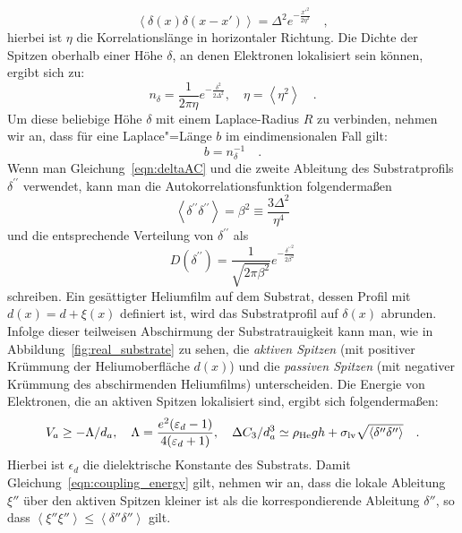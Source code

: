     \begin{equation}
        \label{eqn:deltaAC}
        \left<\delta(x)\delta(x-x')\right>=\Delta^2 e^{-\frac{x'^2}{2\eta^2}}\quad,
    \end{equation}
hierbei ist $\eta$ die Korrelationslänge in horizontaler Richtung. Die Dichte der Spitzen oberhalb einer Höhe $\delta$, an denen Elektronen lokalisiert sein können, ergibt sich zu:
	\begin{equation}
		n_\delta=\frac1{2\pi \eta}e^{-\frac{\delta^2}{2\Delta^2}},
			\quad \eta=\left<\eta^2\right>\quad.
	\end{equation}
Um diese beliebige Höhe $\delta$ mit einem Laplace-Radius $R$ zu verbinden, nehmen wir an, dass für eine Laplace"=Länge $b$ im eindimensionalen Fall gilt:
	\begin{equation}
		b=n_\delta^{-1}\quad.
	\end{equation}
Wenn man Gleichung~\eqref{eqn:deltaAC} und die zweite Ableitung des Substratprofils $\delta^{\prime\prime}$ verwendet, kann man die Autokorrelationsfunktion folgendermaßen
    \begin{equation}
        \label{eqn:deltappAC}
        \left<\delta^{\prime\prime} \delta^{\prime\prime}\right> = \beta^2\equiv
        \frac{3\Delta^2}{\eta^4}
    \end{equation}
und die entsprechende Verteilung von $\delta^{\prime\prime}$ als
    \begin{equation}
        \label{eqn:Ddeltapp}
		D(\delta^{\prime\prime})= \frac1{\sqrt{2 \pi
		\beta^2}}e^{-\frac{{\delta^{\prime\prime}}^2}{2\beta^2}}	\end{equation}
schreiben.
Ein gesättigter Heliumfilm auf dem Substrat, dessen Profil mit $d(x)= d+\xi(x)$ definiert ist, wird das Substratprofil auf $\delta(x)$ abrunden. Infolge dieser teilweisen Abschirmung der Substratrauigkeit kann man, wie in Abbildung~\ref{fig:real_substrate} zu sehen, die \emph{aktiven Spitzen} (mit positiver Krümmung der Heliumoberfläche $d(x)$) und die \emph{passiven Spitzen} (mit negativer Krümmung des abschirmenden Heliumfilms) unterscheiden. Die Energie von Elektronen, die an aktiven Spitzen lokalisiert sind, ergibt sich folgendermaßen:
\begin{equation}
        \label{eqn:coupling_energy}
        V_a \ge -\Lambda/d_a,\quad \Lambda=\frac{e^2(\varepsilon_d-1)}{4(\varepsilon_d+1)},
        \quad \Delta C_3/d_a^3 \simeq \rho_\text{He} g h +\sigma_\text{lv}\sqrt{\left<\delta^{\prime\prime}
        \delta^{\prime\prime}\right>}\quad.
    \end{equation}
Hierbei ist $\epsilon_d$ die dielektrische Konstante des Substrats. Damit Gleichung~\eqref{eqn:coupling_energy} gilt, nehmen wir an, dass die lokale Ableitung $\xi''$ über den aktiven Spitzen kleiner ist als die korrespondierende Ableitung $\delta''$, so dass $\left<\xi''\xi''\right> \leq \left<\delta''\delta''\right>$ gilt.
    
